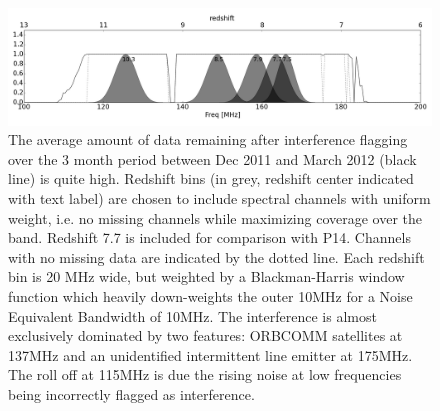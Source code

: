 \documentclass[preprint]{aastex}
\begin{document}
  
 \begin{figure}
\centering
\includegraphics[width=\textwidth]{figures/psa32_flagging_zbins.png}
\caption{\label{fig:bins} The average amount of data remaining after interference flagging over the 3 month period between Dec 2011 and March 2012 (black line) is quite high.  Redshift bins (in grey, redshift center indicated with text label) are chosen to include spectral channels with uniform weight, i.e. no missing channels while maximizing coverage over the band.  Redshift 7.7 is included for comparison with P14.  Channels with no missing data are indicated by the dotted line. Each redshift bin is 20 MHz wide, but weighted by a Blackman-Harris window function which heavily down-weights the outer 10MHz for a Noise Equivalent Bandwidth of 10MHz.  The interference is almost exclusively dominated by two features: ORBCOMM satellites at 137MHz and an unidentified intermittent line emitter at 175MHz. The roll off at 115MHz is due the rising noise at low frequencies being incorrectly flagged as interference.  }
\end{figure} 
\end{document}
